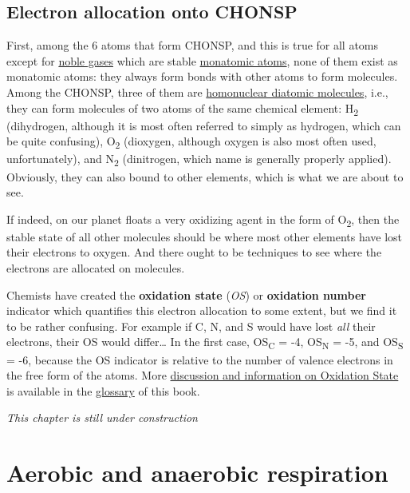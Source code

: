 \documentclass[]{book}
\theoremstyle{definition}
\theoremstyle{definition}
\theoremstyle{definition}
\theoremstyle{remark}
\begin{document}
\section{Electron allocation onto
CHONSP}\label{electron-allocation-onto-chonsp}

First, among the 6 atoms that form CHONSP, and this is true for all
atoms except for \href{https://en.wikipedia.org/wiki/Noble_gas}{noble
gases} which are stable
\href{https://en.wikipedia.org/wiki/Monatomic_gas}{monatomic atoms},
none of them exist as monatomic atoms: they always form bonds with other
atoms to form molecules. Among the CHONSP, three of them are
\href{https://en.wikipedia.org/wiki/Diatomic_molecule}{homonuclear
diatomic molecules}, i.e., they can form molecules of two atoms of the
same chemical element: H\textsubscript{2} (dihydrogen, although it is
most often referred to simply as hydrogen, which can be quite
confusing), O\textsubscript{2} (dioxygen, although oxygen is also most
often used, unfortunately), and N\textsubscript{2} (dinitrogen, which
name is generally properly applied). Obviously, they can also bound to
other elements, which is what we are about to see.

If indeed, on our planet floats a very oxidizing agent in the form of
O\textsubscript{2}, then the stable state of all other molecules should
be where most other elements have lost their electrons to oxygen. And
there ought to be techniques to see where the electrons are allocated on
molecules.

Chemists have created the \textbf{oxidation state} (\emph{OS}) or
\textbf{oxidation number} indicator which quantifies this electron
allocation to some extent, but we find it to be rather confusing. For
example if C, N, and S would have lost \emph{all} their electrons, their
OS would differ\ldots{} In the first case, OS\textsubscript{C} = -4,
OS\textsubscript{N} = -5, and OS\textsubscript{S} = -6, because the OS
indicator is relative to the number of valence electrons in the free
form of the atoms. More \protect\hyperlink{oxidation-state}{discussion
and information on Oxidation State} is available in the
\protect\hyperlink{glossary}{glossary} of this book.

\emph{This chapter is still under construction}

\chapter{Aerobic and anaerobic
respiration}\label{aerobic-and-anaerobic-respiration}
\end{document}
